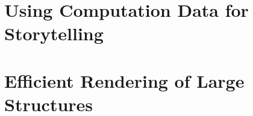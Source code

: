 


%
%
%
%
%
%
%
%


%
%
%
%
% 
%
%
%
%


\section{Using Computation Data for Storytelling}

\section{Efficient Rendering of Large Structures}

